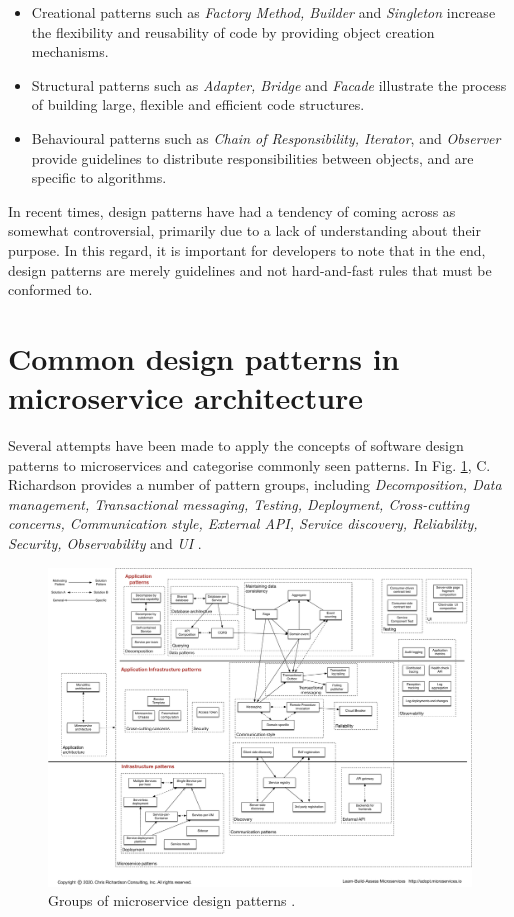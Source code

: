 \begin{itemize}
  \item Creational patterns such as \textit{Factory Method, Builder} and \textit{Singleton} increase the flexibility and reusability of code by providing object creation mechanisms.
  \item Structural patterns such as \textit{Adapter, Bridge} and \textit{Facade} illustrate the process of building large, flexible and efficient code structures.
  \item Behavioural patterns such as \textit{Chain of Responsibility, Iterator}, and \textit{Observer} provide guidelines to distribute responsibilities between objects, and are specific to algorithms.
\end{itemize}

In recent times, design patterns have had a tendency of coming across as somewhat controversial, primarily due to a lack of understanding about their purpose. In this regard, it is important for developers to note that in the end, design patterns are merely guidelines and not hard-and-fast rules that must be conformed to.

\section{Common design patterns in microservice architecture}

Several attempts have been made to  apply the concepts of software design patterns to microservices and categorise commonly seen patterns. In Fig. \ref{fig:richardson-patterns}, C. Richardson provides a number of pattern groups, including \textit{Decomposition, Data management, Transactional messaging, Testing, Deployment, Cross-cutting concerns, Communication style, External API, Service discovery, Reliability, Security, Observability} and \textit{UI} \cite{richardson-patterns}.

\begin{figure}[h]
  \centering
  \includegraphics[width=1.0\linewidth]{./assets/images/related-work/richardson-patterns.pdf}
  \caption{Groups of microservice design patterns \cite{richardson-patterns}.}
  \label{fig:richardson-patterns}
\end{figure}

